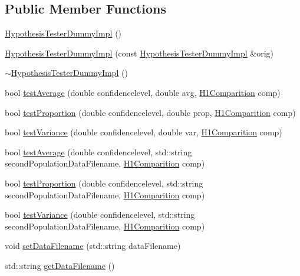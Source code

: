 \subsection*{Public Member Functions}
\begin{DoxyCompactItemize}
\item 
\hyperlink{class_hypothesis_tester_dummy_impl_aaf1b0082669d9919c8ee18cf06f97c00}{Hypothesis\+Tester\+Dummy\+Impl} ()
\item 
\hyperlink{class_hypothesis_tester_dummy_impl_a4c2878a4da9c42cacc0726016df6492b}{Hypothesis\+Tester\+Dummy\+Impl} (const \hyperlink{class_hypothesis_tester_dummy_impl}{Hypothesis\+Tester\+Dummy\+Impl} \&orig)
\item 
\hyperlink{class_hypothesis_tester_dummy_impl_a604e36c3fa5d99dfa33a86d51398223e}{$\sim$\+Hypothesis\+Tester\+Dummy\+Impl} ()
\item 
bool \hyperlink{class_hypothesis_tester_dummy_impl_ac3c4e7af925e74d89d6d8974d5b5f54b}{test\+Average} (double confidencelevel, double avg, \hyperlink{class_hypothesis_tester__if_a89153ff990252f9f79856a2f2532c349}{H1\+Comparition} comp)
\item 
bool \hyperlink{class_hypothesis_tester_dummy_impl_a815efa8f1265cb7636f0e622f1e760a9}{test\+Proportion} (double confidencelevel, double prop, \hyperlink{class_hypothesis_tester__if_a89153ff990252f9f79856a2f2532c349}{H1\+Comparition} comp)
\item 
bool \hyperlink{class_hypothesis_tester_dummy_impl_ad7bf6740aa7f5d2a57625b4933c4cdc0}{test\+Variance} (double confidencelevel, double var, \hyperlink{class_hypothesis_tester__if_a89153ff990252f9f79856a2f2532c349}{H1\+Comparition} comp)
\item 
bool \hyperlink{class_hypothesis_tester_dummy_impl_ab5f212676d5f42b639702c9a737da07f}{test\+Average} (double confidencelevel, std\+::string second\+Population\+Data\+Filename, \hyperlink{class_hypothesis_tester__if_a89153ff990252f9f79856a2f2532c349}{H1\+Comparition} comp)
\item 
bool \hyperlink{class_hypothesis_tester_dummy_impl_aa713d0b66446c80053edc0c15a28ebe9}{test\+Proportion} (double confidencelevel, std\+::string second\+Population\+Data\+Filename, \hyperlink{class_hypothesis_tester__if_a89153ff990252f9f79856a2f2532c349}{H1\+Comparition} comp)
\item 
bool \hyperlink{class_hypothesis_tester_dummy_impl_a0947f4b4e5829dc66bc8cf0a5113b94b}{test\+Variance} (double confidencelevel, std\+::string second\+Population\+Data\+Filename, \hyperlink{class_hypothesis_tester__if_a89153ff990252f9f79856a2f2532c349}{H1\+Comparition} comp)
\item 
void \hyperlink{class_hypothesis_tester_dummy_impl_a43f07179a7fd3825a00cbddf07eea13a}{set\+Data\+Filename} (std\+::string data\+Filename)
\item 
std\+::string \hyperlink{class_hypothesis_tester_dummy_impl_ae30c2fa88b87f19bd62ae5e557620e3c}{get\+Data\+Filename} ()
\end{DoxyCompactItemize}
